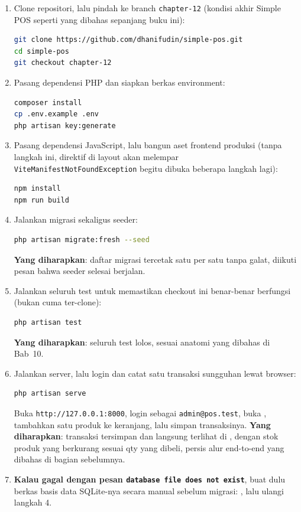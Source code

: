 \begin{enumerate}
  \item Clone repositori, lalu pindah ke branch \texttt{chapter-12}
    (kondisi akhir Simple POS seperti yang dibahas sepanjang buku ini):
    \begin{lstlisting}[language=bash]
git clone https://github.com/dhanifudin/simple-pos.git
cd simple-pos
git checkout chapter-12
    \end{lstlisting}
  \item Pasang dependensi PHP dan siapkan berkas environment:
    \begin{lstlisting}[language=bash]
composer install
cp .env.example .env
php artisan key:generate
    \end{lstlisting}
  \item Pasang dependensi JavaScript, lalu bangun aset frontend produksi
    (tanpa langkah ini, direktif  di layout akan melempar
    \texttt{ViteManifestNotFoundException} begitu  dibuka
    beberapa langkah lagi):
    \begin{lstlisting}[language=bash]
npm install
npm run build
    \end{lstlisting}
  \item Jalankan migrasi sekaligus seeder:
    \begin{lstlisting}[language=bash]
php artisan migrate:fresh --seed
    \end{lstlisting}
    \textbf{Yang diharapkan}: daftar migrasi tercetak satu per satu
    tanpa galat, diikuti pesan bahwa seeder selesai berjalan.
  \item Jalankan seluruh test untuk memastikan checkout ini benar-benar
    berfungsi (bukan cuma ter-clone):
    \begin{lstlisting}[language=bash]
php artisan test
    \end{lstlisting}
    \textbf{Yang diharapkan}: seluruh test lolos, sesuai anatomi yang
    dibahas di Bab~10.
  \item Jalankan server, lalu login dan catat satu transaksi
    sungguhan lewat browser:
    \begin{lstlisting}[language=bash]
php artisan serve
    \end{lstlisting}
    Buka \texttt{http://127.0.0.1:8000}, login sebagai
    \texttt{admin@pos.test}, buka , tambahkan satu produk ke
    keranjang, lalu simpan transaksinya. \textbf{Yang diharapkan}:
    transaksi tersimpan dan langsung terlihat di ,
    dengan stok produk yang berkurang sesuai qty yang dibeli, persis
    alur end-to-end yang dibahas di bagian sebelumnya.
  \item \textbf{Kalau  gagal dengan pesan
    \texttt{database file does not exist}}, buat dulu berkas basis data
    SQLite-nya secara manual sebelum migrasi: , lalu ulangi langkah 4.
\end{enumerate}

